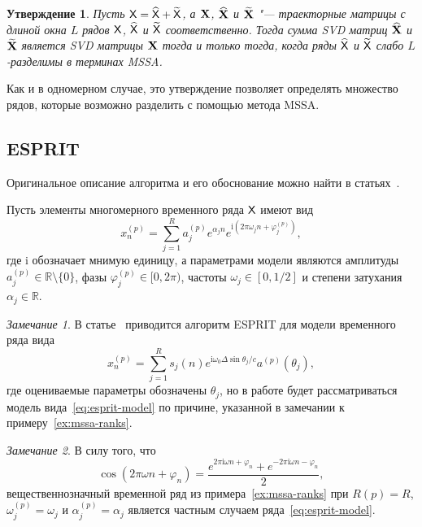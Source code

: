 \documentclass[specialist,
  substylefile=spbu.rtx,
subf,href,colorlinks=true, 12pt]{disser}
\theoremstyle{plain}
\newtheorem{statement}{Утверждение}[section]
\theoremstyle{definition}
\theoremstyle{remark}
\newtheorem*{remark}{Замечание}
\newcommand{\iu}{\mathrm{i}}
\begin{document}
\begin{statement}
  \label{state:mssa-separability}
  Пусть $\mathsf{X} = \widehat{\mathsf{X}} + \widetilde{\mathsf{X}}$, а $\mathbf{X}$, $\widehat{\mathbf{X}}$ и $\widetilde{\mathbf{X}}$ "--- траекторные
  матрицы с длиной окна $L$ рядов $\mathsf{X}$, $\widehat{\mathsf{X}}$ и $\widetilde{\mathsf{X}}$ соответственно.
  Тогда сумма \emph{SVD} матриц $\widehat{\mathbf{X}}$ и $\widetilde{\mathbf{X}}$ является \emph{SVD} матрицы $\mathbf{X}$ тогда и только тогда, когда
  ряды $\widehat{\mathsf{X}}$ и $\widetilde{\mathsf{X}}$ слабо $L$-разделимы в терминах MSSA.
\end{statement}
Как и в одномерном случае, это утверждение позволяет определять множество рядов, которые возможно разделить с
помощью метода MSSA.

\subsection{ESPRIT}\label{subsec:esprit}
Оригинальное описание алгоритма и его обоснование
можно найти в статьях~\cite{esprit,hosvd-hooi-separation}.

Пусть элементы многомерного временного ряда $\mathsf{X}$ имеют вид
\begin{equation}
  \label{eq:esprit-model}
  x_n^{(p)} = \sum_{j=1}^{R} a_j^{(p)} e^{ \alpha_j n }
  e^{\iu \left( 2 \pi \omega_j n + \varphi_j^{(p)}\right)},
\end{equation}
где $\iu$ обозначает мнимую единицу, а параметрами модели являются амплитуды
$a_j^{(p)} \in \mathbb{R}\setminus\{0\}$, фазы ${\varphi_j^{(p)} \in [0, 2\pi)}$,
частоты $\omega_j\in [0, 1/2]$ и степени затухания $\alpha_j \in \mathbb{R}$.

\begin{remark}
  В статье~\cite{esprit} приводится алгоритм ESPRIT для модели временного ряда вида
  \[
    x_n^{(p)} = \sum_{j=1}^{R} s_j(n)e^{\iu \omega_0 \Delta \sin\theta_j / c} a^{(p)}(\theta_j),
  \]
  где оцениваемые параметры обозначены $\theta_j$,
  но в работе будет рассматриваться модель вида~\eqref{eq:esprit-model} по причине,
  указанной в замечании к примеру~\ref{ex:mssa-ranks}.
\end{remark}
\begin{remark}
  В силу того, что
  \[
    \cos(2 \pi \omega n + \varphi_n) =
    \frac{e^{2\pi \iu \omega n + \varphi_n} + e^{-2\pi \iu \omega n - \varphi_n}}{2},
  \]
  вещественнозначный временной ряд из примера~\ref{ex:mssa-ranks} при
  $R(p)=R$, $\omega_j^{(p)}=\omega_j$ и $\alpha_j^{(p)}=\alpha_j$ является частным случаем
  ряда~\eqref{eq:esprit-model}.
\end{remark}
\end{document}

